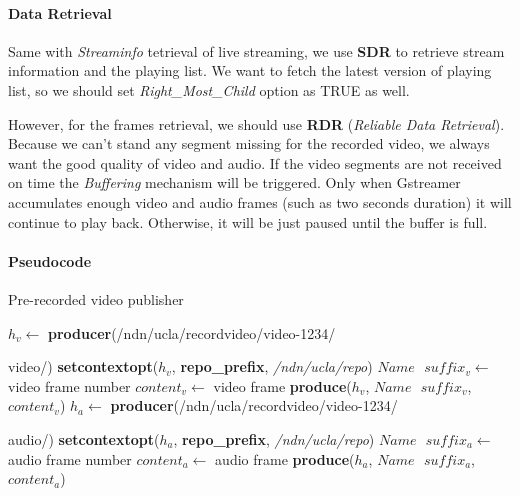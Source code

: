 \paragraph{Data Retrieval}
Same with \textit{Streaminfo} tetrieval of live streaming, we use \textbf{SDR} to retrieve stream information and the playing list. We want to fetch the latest version of playing list, so we should set \textit{Right\_Most\_Child} option as TRUE as well.

However, for the frames retrieval, we should use \textbf{RDR} (\textit{Reliable Data Retrieval}). Because we can't stand any segment missing for the recorded video, we always want the good quality of video and audio. If the video segments are not received on time the \textit{Buffering} mechanism will be triggered. Only when Gstreamer accumulates enough video and audio frames (such as two seconds duration) it will continue to play back. Otherwise, it will be just paused until the buffer is full.

\paragraph{Pseudocode}

\begin{algorithm}[hbtp]
\caption{Pre-recorded video publisher}
\label{alg:recordproducer}
\begin{algorithmic}[3]
\State $h_v \leftarrow $ \textbf{producer}(/ndn/ucla/recordvideo/video-1234/

video/)
\State \textbf{setcontextopt}($h_v$, \textbf{repo\_prefix}, \textit{/ndn/ucla/repo})
\vspace{0.2cm}
	\State $Name \textbf{ } suffix_v \leftarrow $ video frame number
	\State $content_v \leftarrow $ video frame
	\State \textbf{produce}($h_v$, $Name\textbf{ }suffix_v$, $content_v$)
	\EndWhile
\vspace{0.2cm}
\vspace{0.2cm}
\State $h_a \leftarrow $ \textbf{producer}(/ndn/ucla/recordvideo/video-1234/

audio/)
\State \textbf{setcontextopt}($h_a$, \textbf{repo\_prefix}, \textit{/ndn/ucla/repo})
\vspace{0.2cm}
	\State $Name \textbf{ } suffix_a \leftarrow $ audio frame number
	\State $content_a \leftarrow $ audio frame
	\State \textbf{produce}($h_a$, $Name\textbf{ }suffix_a$, $content_a$)
	\EndWhile
\end{algorithmic}
\end{algorithm}

